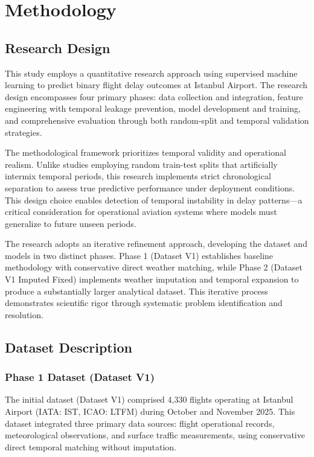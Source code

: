 \documentclass{report}
\begin{document}
\chapter{Methodology}
\label{ch:methodology}

\section{Research Design}
\label{sec:research_design}

This study employs a quantitative research approach using supervised machine learning to predict binary flight delay outcomes at Istanbul Airport. The research design encompasses four primary phases: data collection and integration, feature engineering with temporal leakage prevention, model development and training, and comprehensive evaluation through both random-split and temporal validation strategies.

The methodological framework prioritizes temporal validity and operational realism. Unlike studies employing random train-test splits that artificially intermix temporal periods, this research implements strict chronological separation to assess true predictive performance under deployment conditions. This design choice enables detection of temporal instability in delay patterns—a critical consideration for operational aviation systems where models must generalize to future unseen periods.

The research adopts an iterative refinement approach, developing the dataset and models in two distinct phases. Phase 1 (Dataset V1) establishes baseline methodology with conservative direct weather matching, while Phase 2 (Dataset V1 Imputed Fixed) implements weather imputation and temporal expansion to produce a substantially larger analytical dataset. This iterative process demonstrates scientific rigor through systematic problem identification and resolution.

\section{Dataset Description}
\label{sec:dataset}

\subsection{Phase 1 Dataset (Dataset V1)}
\label{sec:phase1_dataset}

The initial dataset (Dataset V1) comprised 4,330 flights operating at Istanbul Airport (IATA: IST, ICAO: LTFM) during October and November 2025. This dataset integrated three primary data sources: flight operational records, meteorological observations, and surface traffic measurements, using conservative direct temporal matching without imputation.
\end{document}
